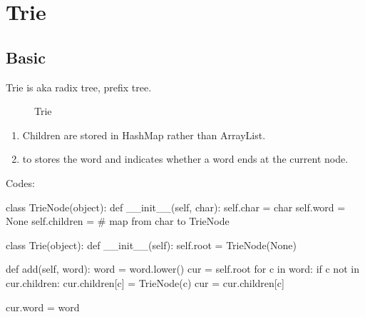 \newpage
\section{Trie}
\subsection{Basic}
Trie is aka radix tree, prefix tree. 
\begin{figure}[hbtp]
\centering
{}
\caption{Trie}
\label{fig:trie} 
\end{figure}
\begin{enumerate}
\item Children are stored in HashMap rather than ArrayList. 
\item {} to stores the word and indicates whether a word ends at the current
node. 
\end{enumerate}
Codes:
\begin{python}
class TrieNode(object):
    def __init__(self, char):
        self.char = char
        self.word = None
        self.children = {}  # map from char to TrieNode


class Trie(object):
    def __init__(self):
        self.root = TrieNode(None)

    def add(self, word):
        word = word.lower()
        cur = self.root
        for c in word:
            if c not in cur.children:
                cur.children[c] = TrieNode(c)
            cur = cur.children[c]
            
        cur.word = word
\end{python}

